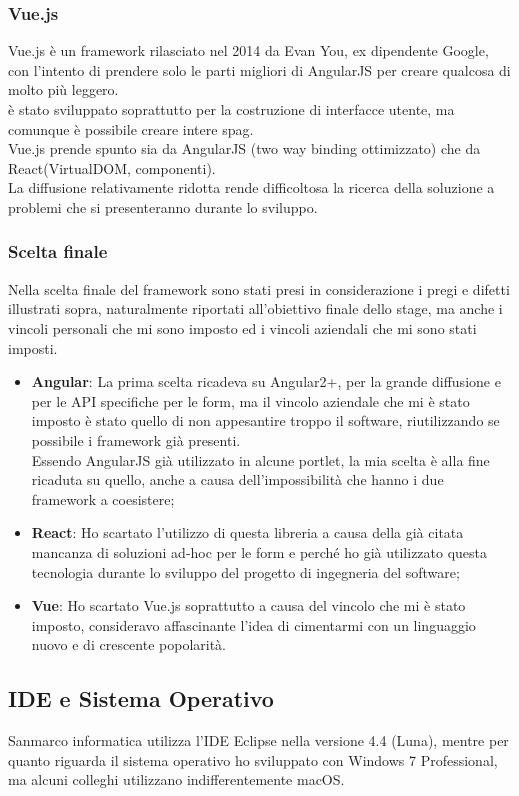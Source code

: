 \subsubsection{Vue.js}
Vue.js è un framework rilasciato nel 2014 da Evan You, ex dipendente Google, con l'intento di prendere solo le parti migliori di AngularJS per creare qualcosa di molto più leggero.\\
è stato sviluppato soprattutto per la costruzione di interfacce utente, ma comunque è possibile creare intere \gls{spag}.\\
Vue.js prende spunto sia da AngularJS (two way binding ottimizzato) che da React(VirtualDOM, componenti). \\
La diffusione relativamente ridotta rende difficoltosa la ricerca della soluzione a problemi che si presenteranno durante lo sviluppo.

\subsubsection{Scelta finale}
Nella scelta finale del framework sono stati presi in considerazione i pregi e difetti illustrati sopra, naturalmente riportati all'obiettivo finale dello stage, ma anche i vincoli personali che mi sono imposto ed i vincoli aziendali che mi sono stati imposti.
\begin{itemize}
	\item \textbf{Angular}: La prima scelta ricadeva su Angular2+, per la grande diffusione e per le API specifiche per le form, ma il vincolo aziendale che mi è stato imposto è stato quello di non appesantire troppo il software, riutilizzando se possibile i framework già presenti.\\
	Essendo AngularJS già utilizzato in alcune portlet, la mia scelta è alla fine ricaduta su quello, anche a causa dell'impossibilità che hanno i due framework a coesistere;
	\item \textbf{React}: Ho scartato l'utilizzo di questa libreria a causa della già citata mancanza di soluzioni ad-hoc per le form e perché ho già utilizzato questa tecnologia durante lo sviluppo del progetto di ingegneria del software;
	\item \textbf{Vue}: Ho scartato Vue.js soprattutto a causa del vincolo che mi è stato imposto, consideravo affascinante l'idea di cimentarmi con un linguaggio nuovo e di crescente popolarità.
\end{itemize}
\subsection{IDE e Sistema Operativo}
Sanmarco informatica utilizza l'IDE Eclipse nella versione 4.4 (Luna), mentre per quanto riguarda il sistema operativo ho sviluppato con Windows 7 Professional, ma alcuni colleghi utilizzano indifferentemente macOS.

